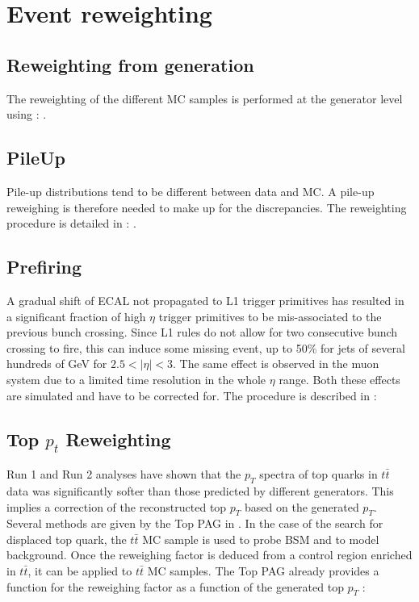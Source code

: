 \documentclass{cernatlasnote}
\begin{document}
\newpage

\section{Event reweighting}
    \label{EVENT_W}
    \subsection{Reweighting from generation}
        The reweighting of the different MC samples is performed at the generator level using : \cite{LHEReaderCMSSW}.
    \subsection{PileUp}
        Pile-up distributions tend to be different between data and MC. A pile-up reweighing is therefore needed to make up for the discrepancies. The reweighting procedure is detailed in : \cite{PileupMCReweightingUtilities}.
        
    \subsection{Prefiring}
        A gradual shift of ECAL not propagated to L1 trigger primitives has resulted in a significant fraction of high $\eta$ trigger primitives to be mis-associated to the previous bunch crossing. Since L1 rules do not allow for two consecutive bunch crossing to fire, this can induce some missing event, up to 50\% for jets of several hundreds of GeV for $2.5<|\eta|<3$. The same effect is observed in the muon system due to a limited time resolution in the whole $\eta$ range. Both these effects are simulated and have to be corrected for. The procedure is described in : \cite{L1PrefiringWeightRecipe}
    \subsection{Top $p_{t}$ Reweighting}
            
            Run 1 and Run 2 analyses have shown that the $p_T$ spectra of top quarks in $t\bar{t}$ data was significantly softer than those predicted by different generators. This implies a correction of the reconstructed top $p_T$ based  on the generated $p_T$. Several methods are given by the Top PAG in \cite{TopPtReweighting}. In the case of the search for displaced top quark, the $t\bar{t}$ MC sample is used to probe BSM and to model background. Once the reweighing factor is deduced from a control region enriched in $t\bar{t}$, it can be applied to $t\bar{t}$ MC samples. The Top PAG already provides a function for the reweighing factor as a function of the generated top $p_T$ :
\end{document}
